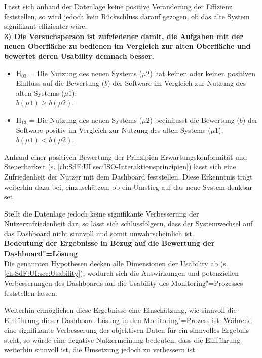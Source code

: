 Lässt sich anhand der Datenlage keine positive Veränderung der Effizienz feststellen, so wird jedoch kein Rückschluss darauf gezogen, ob das alte System signifikant effizienter wäre.\\

\noindent
\textbf{3) Die Versuchsperson ist zufriedener damit, die Aufgaben mit der neuen Oberfläche zu bedienen im Vergleich zur alten Oberfläche und bewertet deren Usability demnach besser.}

\begin{itemize}
    \item H$_{03}$ = Die Nutzung des neuen Systems ($\mu2$) hat keinen oder keinen positiven Einfluss auf die Bewertung ($b$) der Software im Vergleich zur Nutzung des alten Systems ($\mu1$); \\$b(\mu1) \geq b(\mu2)$.
    \item H$_{13}$ = Die Nutzung des neuen Systems ($\mu2$) beeinflusst die Bewertung ($b$) der Software positiv im Vergleich zur Nutzung des alten Systems ($\mu1$); \\$b(\mu1) < b(\mu2)$.
\end{itemize}

\noindent
Anhand einer positiven Bewertung der Prinzipien Erwartungskonformität und Steuerbarkeit \cite{DIN_EN_ISO_9241-110} (s. \autoref{ch:SdF:UI:sec:ISO-Interaktionsprinzipien}) lässt sich eine Zufriedenheit der Nutzer mit dem Dash\-board feststellen. Diese Erkenntnis trägt weiterhin dazu bei, einzuschätzen, ob ein Umstieg auf das neue System denkbar sei.

Stellt die Datenlage jedoch keine signifikante Verbesserung der Nutzerzufriedenheit dar, so lässt sich schlussfolgern, dass der Systemwechsel auf das Dash\-board nicht sinnvoll und somit unwahrscheinlich ist.\\

\noindent
\textbf{Bedeutung der Ergebnisse in Bezug auf die Bewertung der Dash\-board"=Lösung}\\
Die genannten Hypothesen decken alle Dimensionen der Usability ab (s. \autoref{ch:SdF:UI:sec:Usability}), wodurch sich die Auswirkungen und potenziellen Verbesserungen des Dash\-boards auf die Usability des Monitoring"=Prozesses feststellen lassen.

Weiterhin ermöglichen diese Ergebnisse eine Einschätzung, wie sinnvoll die Einführung dieser Dashboard-Lösung in den Monitoring"=Prozess ist. Während eine signifikante Verbesserung der objektiven Daten für ein sinnvolles Ergebnis steht, so würde eine negative Nutzermeinung bedeuten, dass die Einführung weiterhin sinnvoll ist, die Umsetzung jedoch zu verbessern ist.

